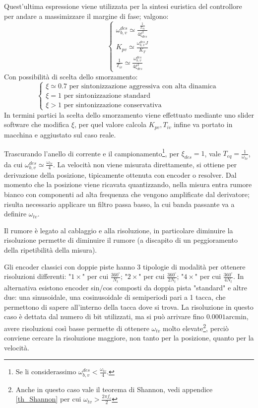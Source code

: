 Quest'ultima espressione viene utilizzata per la sintesi euristica del controllore per andare a massimizzare il margine di fase; valgono:
\[
\begin{cases}
    \omega_{b,v}^{des} \simeq \frac{\frac{1}{T_{eq}}}{4\xi^2_{des}} \\
    K_{pv} \simeq \frac{\omega_{b,v}^{des}J}{K_T} \\
    \frac{1}{T_{iv}} \simeq \frac{\omega_{b,v}^{des}}{4\xi^2_{des}}
\end{cases}
\]
Con possibilità di scelta dello smorzamento:
\[
\begin{cases}
    \xi \simeq 0.7 \text{ \ per sintonizzazione aggressiva con alta dinamica } \\
    \xi = 1 \text{ \ per sintonizzazione standard} \\
    \xi > 1 \text{ \ per sintonizzazione conservativa}
\end{cases}
\]
In termini partici la scelta dello smorzamento viene effettuato mediante uno slider software che modifica \(\xi\), per quel valore calcola \(K_{pv}, T_{iv}\) infine va portato in macchina e aggiustato sul caso reale.

Trascurando l'anello di corrente e il campionamento\footnote{Se li considerassimo \(\omega_{b,v}^{des} < \frac{\omega_{tv}}{4}\).}, per \(\xi_{des}=1\), vale \(T_{eq}=\frac{1}{\omega_{tv}}\), da cui \(\omega_{b,v}^{des}\simeq \frac{\omega_{tv}}{4}\).
La velocità non viene misurata direttamente, si ottiene per derivazione della posizione, tipicamente ottenuta con encoder o resolver. Dal momento che la posizione viene ricavata quantizzando, nella misura entra rumore bianco con componenti ad alta frequenza che vengono amplificate dal derivatore; risulta necessario applicare un filtro passa basso, la cui banda passante va a definire \(\omega_{tv}\).

Il rumore è legato al cablaggio e alla risoluzione, in particolare diminuire la risoluzione permette di diminuire il rumore (a discapito di un peggioramento della ripetibilità della misura). 

Gli encoder classici con doppie piste hanno 3 tipologie di modalità per ottenere risoluzioni differenti: "\(1\times\)" per cui \(\frac{360^\circ}{N_t}\); "\(2\times\)" per cui \(\frac{360^\circ}{2N_t}\); "\(4\times\)" per cui \(\frac{360^\circ}{4N_t}\).
In alternativa esistono encoder sin/cos composti da doppia pista "standard" e altre due: una sinusoidale, una cosinusoidale di semiperiodi pari a 1 tacca, che permettono di sapere all'interno della tacca dove si trova. La risoluzione in questo caso è dettata dal numero di bit utilizzati, ma si può arrivare fino \(0.0001 \text{arcmin}\), avere risoluzioni così basse permette di ottenere \(\omega_{tv}\) molto elevate\footnote{Anche in questo caso vale il teorema di Shannon, vedi appendice \ref{th_Shannon} per cui \(\omega_{tv}>\frac{2\pi f_c}{2}\)}, perciò conviene cercare la risoluzione maggiore, non tanto per la posizione, quanto per la velocità.

